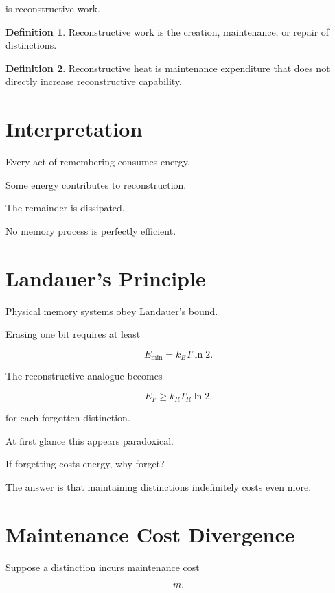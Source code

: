 \documentclass[12pt,oneside]{book}
\theoremstyle{plain} \newtheorem{theorem}{Theorem}[chapter] \newtheorem{lemma}[theorem]{Lemma} \newtheorem{proposition}[theorem]{Proposition} \newtheorem{corollary}[theorem]{Corollary}
\theoremstyle{definition} \newtheorem{definition}[theorem]{Definition} \newtheorem{axiom}[theorem]{Axiom} \newtheorem{construction}[theorem]{Construction}
\theoremstyle{remark} \newtheorem{remark}[theorem]{Remark} \newtheorem{example}[theorem]{Example}
\begin{document}
is reconstructive work.

\begin{definition}

Reconstructive work is the creation, maintenance, or repair of distinctions.

\end{definition}

\begin{definition}

Reconstructive heat is maintenance expenditure that does not directly increase reconstructive capability.

\end{definition}

\section{Interpretation}

Every act of remembering consumes energy.

Some energy contributes to reconstruction.

The remainder is dissipated.

No memory process is perfectly efficient.

\section{Landauer's Principle}

Physical memory systems obey Landauer's bound.

Erasing one bit requires at least

\[
E_{\min}
=
k_B T
\ln 2.
\]

The reconstructive analogue becomes

\[
E_F
\ge
k_R T_R
\ln 2.
\]

for each forgotten distinction.

At first glance this appears paradoxical.

If forgetting costs energy, why forget?

The answer is that maintaining distinctions indefinitely costs even more.

\section{Maintenance Cost Divergence}

Suppose a distinction incurs maintenance cost

\[
m.
\]
\end{document}
